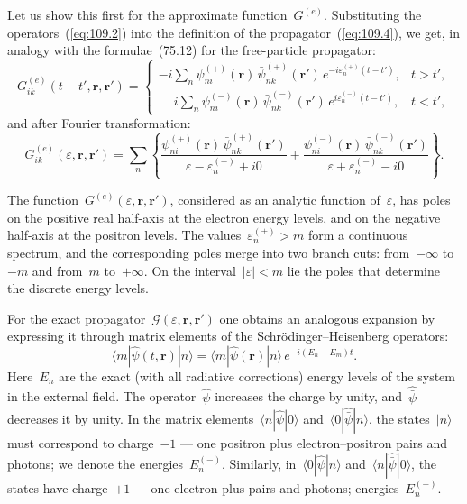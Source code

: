 Let us show this first for the approximate function~$G^{(e)}$. Substituting the operators~(\ref{eq:109.2}) into the definition of the propagator~(\ref{eq:109.4}), we get, in analogy with the formulae~(75.12) for the free-particle propagator:
\begin{equation}
G^{(e)}_{ik}(t - t', \mathbf{r}, \mathbf{r}') =
\begin{cases}
\displaystyle -i\sum_n \psi_{ni}^{(+)}(\mathbf{r})\,\bar{\psi}_{nk}^{(+)}(\mathbf{r}')\,e^{-i\varepsilon_n^{(+)}(t - t')}, & t > t', \\[8pt]
\displaystyle \phantom{-}i\sum_n \psi_{ni}^{(-)}(\mathbf{r})\,\bar{\psi}_{nk}^{(-)}(\mathbf{r}')\,e^{i\varepsilon_n^{(-)}(t - t')}, & t < t',
\end{cases}
\label{eq:109.18}
\end{equation}
and after Fourier transformation:
\begin{equation}
G^{(e)}_{ik}(\varepsilon, \mathbf{r}, \mathbf{r}') = \sum_n\left\{\frac{\psi_{ni}^{(+)}(\mathbf{r})\,\bar{\psi}_{nk}^{(+)}(\mathbf{r}')}{\varepsilon - \varepsilon_n^{(+)} + i0} + \frac{\psi_{ni}^{(-)}(\mathbf{r})\,\bar{\psi}_{nk}^{(-)}(\mathbf{r}')}{\varepsilon + \varepsilon_n^{(-)} - i0}\right\}.
\label{eq:109.19}
\end{equation}

The function~$G^{(e)}(\varepsilon, \mathbf{r}, \mathbf{r}')$, considered as an analytic function of~$\varepsilon$, has poles on the positive real half-axis at the electron energy levels, and on the negative half-axis at the positron levels. The values~$\varepsilon_n^{(\pm)} > m$ form a continuous spectrum, and the corresponding poles merge into two branch cuts: from~$-\infty$ to~$-m$ and from~$m$ to~$+\infty$. On the interval~$|\varepsilon| < m$ lie the poles that determine the discrete energy levels.


For the exact propagator~$\mathcal{G}(\varepsilon, \mathbf{r}, \mathbf{r}')$ one obtains an analogous expansion by expressing it through matrix elements of the Schr\"odinger--Heisenberg operators:
\begin{equation}
\langle m|\hat{\psi}(t, \mathbf{r})|n\rangle = \langle m|\hat{\psi}(\mathbf{r})|n\rangle\,e^{-i(E_n - E_m)t}.
\label{eq:109.20}
\end{equation}
Here~$E_n$ are the exact (with all radiative corrections) energy levels of the system in the external field. The operator~$\hat{\psi}$ increases the charge by unity, and~$\hat{\bar{\psi}}$ decreases it by unity. In the matrix elements~$\langle n|\hat{\psi}|0\rangle$ and~$\langle 0|\hat{\bar{\psi}}|n\rangle$, the states~$|n\rangle$ must correspond to charge~$-1$ --- one positron plus electron--positron pairs and photons; we denote the energies~$E_n^{(-)}$. Similarly, in~$\langle 0|\hat{\psi}|n\rangle$ and~$\langle n|\hat{\bar{\psi}}|0\rangle$, the states have charge~$+1$ --- one electron plus pairs and photons; energies~$E_n^{(+)}$.

